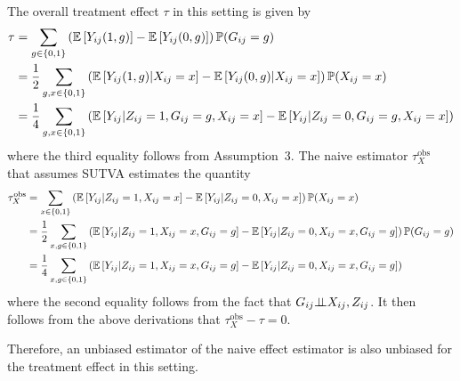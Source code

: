 \documentclass[10pt]{article}
\begin{document}
The overall treatment effect $\tau$ in this setting is given by
\begin{align*}
\tau %
&= \sum_{g\in\{0,1\}} \left(\E\left[Y_{ij}(1,g)\right] - \E\left[Y_{ij}(0,g)\right]\right)\P(G_{ij}=g) \\
&= \frac{1}{2}\sum_{g,x\in\{0,1\}} \left(\E\left[Y_{ij}(1,g)|X_{ij}=x\right] - \E\left[Y_{ij}(0,g)|X_{ij}=x\right]\right)\P(X_{ij}=x) \\
&= \frac{1}{4}\sum_{g,x\in\{0,1\}} \left(\E\left[Y_{ij}|Z_{ij}=1,G_{ij}=g,X_{ij}=x\right] - \E\left[Y_{ij}|Z_{ij}=0,G_{ij}=g,X_{ij}=x\right]\right)
\end{align*}
where the third equality follows from Assumption~3. The naive estimator $\tau_{X}^\text{obs}$ that assumes SUTVA estimates the quantity
\begin{align*}
\tau_{X}^\text{obs} &=
\sum_{x\in\{0,1\}}\left(\mathbb{E}\left[Y_{ij}|Z_{ij}=1,X_{ij}=x\right] - \mathbb{E}\left[Y_{ij}|Z_{ij}=0,X_{ij}=x\right]\right)\mathbb{P}(X_{ij}=x) \\
&= \frac{1}{2}\sum_{x,g\in\{0,1\}}\left(\mathbb{E}\left[Y_{ij}|Z_{ij}=1,X_{ij}=x,G_{ij}=g\right] - \mathbb{E}\left[Y_{ij}|Z_{ij}=0,X_{ij}=x,G_{ij}=g\right]\right)\mathbb{P}(G_{ij}=g) \\
&= \frac{1}{4}\sum_{x,g\in\{0,1\}}\left(\mathbb{E}\left[Y_{ij}|Z_{ij}=1,X_{ij}=x,G_{ij}=g\right] - \mathbb{E}\left[Y_{ij}|Z_{ij}=0,X_{ij}=x,G_{ij}=g\right]\right)
\end{align*}
where the second equality follows from the fact that $G_{ij}{\perp\!\!\!\perp} X_{ij}, Z_{ij}$. It then follows from the above derivations that $\tau_{X}^\text{obs}-\tau = 0$.
\iffalse
and Assumptions~1 and 3 that
\begin{align*}
&\tau_{X}^\text{obs}-\tau \\
&= \tau_{X}^\text{obs} - \frac{1}{2}\left(\mu(1,0) + \mu(1,1) - \mu(0,0) - \mu(0,1)\right) \\
&= \tau_{X}^\text{obs} - \frac{1}{2}\sum_{x\in\{0,1\}}\left(\E\left[Y_{ij}|Z_{ij}=1,X_{ij}=x,G_{ij}=0\right] + \E\left[Y_{ij}|Z_{ij}=1,X_{ij}=x,G_{ij}=1\right]\right. \\
&\quad - \left.\E\left[Y_{ij}|Z_{ij}=0,X_{ij}=x,G_{ij}=0\right] - \E\left[Y_{ij}|Z_{ij}=0,X_{ij}=x,G_{ij}=1\right]\right)\P(X_{ij}=x) \\
&= 0 \;.
\end{align*}
\fi
Therefore, an unbiased estimator of the naive effect estimator is also unbiased for the treatment effect in this setting.
\end{document}

